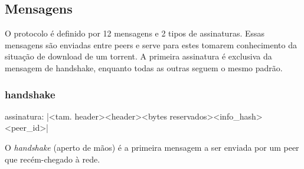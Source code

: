 
\subsection*{Mensagens}

O protocolo é definido por 12 mensagens e 2 tipos de assinaturas. Essas mensagens são
enviadas entre \glspl*{peer} e serve para estes tomarem conhecimento da situação de
download de um \gls*{torrent}. A primeira assinatura é exclusiva da mensagem de
handshake, enquanto todas as outras seguem o mesmo padrão.

\subsubsection*{handshake}

assinatura: \bverb|<tam. header><header><bytes reservados><info_hash><peer_id>|

O \emph{handshake} (aperto de mãos) é a primeira mensagem a ser enviada por um
\gls*{peer} que recém-chegado à rede.

